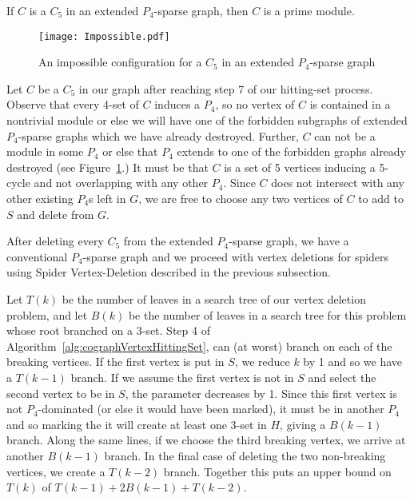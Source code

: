 \documentclass{llncs}
\begin{document}
\begin{theorem}\cite{GV}
If $C$ is a $C_5$ in an extended $P_4$-sparse graph, then $C$ is a prime module.
\end{theorem}

\begin{figure}
    \hspace{3.6cm}
  \texttt{[image: Impossible.pdf]}\\
  \caption{An impossible configuration for a $C_5$ in an extended $P_4$-sparse graph}\label{impossible}
\end{figure}

Let $C$ be a $C_5$ in our graph after reaching step 7 of our hitting-set process. Observe that every 4-set of $C$ induces a $P_4$, so no vertex of $C$ is contained in a nontrivial module or else we will have one of the forbidden subgraphs of extended $P_4$-sparse graphs which we have already destroyed. Further, $C$ can not be a module in some $P_4$ or else that $P_4$ extends to one of the forbidden graphs already destroyed (see Figure~\ref{impossible}.) It must be that $C$ is a set of 5 vertices inducing a 5-cycle and not overlapping with any other $P_4$. Since $C$ does not intersect with any other existing $P_4$s left in $G$, we are free to choose any two vertices of $C$ to add to $S$ and delete from $G$.

After deleting every $C_5$ from the extended $P_4$-sparse graph, we have a conventional $P_4$-sparse graph and we proceed with vertex deletions for spiders using {\sc Spider Vertex-Deletion} described in the previous subsection.

Let $T(k)$ be the number of leaves in a search tree of our vertex deletion problem, and let $B(k)$ be the number of leaves in a search tree for this problem whose root branched on a 3-set. Step 4 of Algorithm~\ref{alg:cographVertexHittingSet}, can (at worst) branch on each of the breaking vertices. If the first vertex is put in $S$, we reduce $k$ by 1 and so we have a $T(k-1)$ branch. If we assume the first vertex is not in $S$ and select the second vertex to be in $S$, the parameter decreases by 1. Since this first vertex is not $P_4$-dominated (or else it would have been marked), it must be in another $P_4$ and so marking the it will create at least one 3-set in $H$, giving a $B(k-1)$ branch. Along the same lines, if we choose the third breaking vertex, we arrive at another $B(k-1)$ branch. In the final case of deleting the two non-breaking vertices, we create a $T(k-2)$ branch. Together this puts an upper bound on $T(k)$ of $T(k-1) + 2B(k-1) + T(k-2)$.
\end{document}
